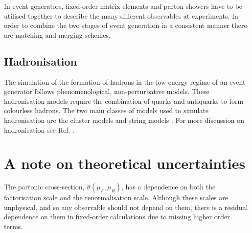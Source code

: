 \documentclass[main.tex]{subfiles}
\begin{document}
    In event generators, fixed-order matrix elements
    and parton showers have to be utilised together to describe
    the many different observables at experiments. In order
    to combine the two stages of event generation in a consistent
    manner there are matching \cite{Frixione:2002ik,Frixione:2007vw,Jadach:2015mza}
    and merging \cite{Catani:2001cc,Lonnblad:2011xx}
    schemes.

    \subsection*{Hadronisation}\label{sec:hadronisation}
    The simulation of the formation of hadrons in the low-energy regime
    of an event generator follows phenomenological, non-perturbative models.
    These hadronisation models require the combination
    of quarks and antiquarks to form colourless hadrons.
    The two main classes of models used to simulate
    hadronisation are the cluster models \cite{Webber:1983if,Winter:2003tt}
    and string models \cite{Andersson:1983ia}.
    For more discussion on hadronisation
    see Ref. \cite{Webber:1999ui}.

    \section{A note on theoretical uncertainties}\label{sec:scale_variations}
    The partonic cross-section, $\hat{\sigma}(\mu_{F}, \mu_{R})$, has
    a dependence on both the factorisation scale and the
    renormalisation scale. Although these scales are unphysical,
    and so any observable should not depend on them,
    there is a residual dependence on them in fixed-order
    calculations due to missing higher order terms.
\end{document}
